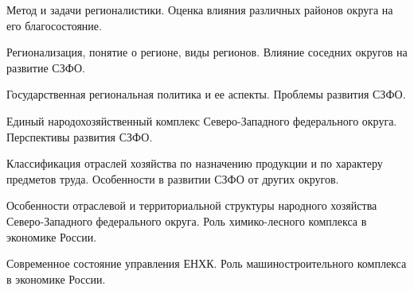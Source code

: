 \documentclass[
	14pt,
	a4paper,
	]
	{scrartcl}
\begin{document}
\shapk
{}
\setcounter{zad}{0}

\vfill
\z Метод и задачи регионалистики.
 \vfill
\z Оценка влияния различных районов округа на его благосостояние. \vfill

\vfill

\newpage


\shapk
{}
\setcounter{zad}{0}

\vfill
\z Регионализация, понятие о регионе, виды регионов.
 \vfill
\z Влияние соседних округов на развитие СЗФО.
 \vfill

\vfill

\newpage


\shapk
{}
\setcounter{zad}{0}

\vfill
\z Государственная региональная политика и ее аспекты.
 \vfill
\z Проблемы развития СЗФО.
 \vfill

\vfill

\newpage


\shapk
{}
\setcounter{zad}{0}

\vfill
\z Единый народохозяйственный комплекс Северо-Западного федерального округа.
 \vfill
\z Перспективы развития СЗФО.
 \vfill

\vfill

\newpage


\shapk
{}
\setcounter{zad}{0}

\vfill
\z Классификация отраслей хозяйства по назначению продукции и по характеру предметов труда.
 \vfill
\z Особенности в развитии СЗФО от других округов.
 \vfill

\vfill

\newpage


\shapk
{}
\setcounter{zad}{0}

\vfill
\z Особенности отраслевой и территориальной структуры народного хозяйства Северо-Западного федерального округа.
 \vfill
\z Роль химико-лесного комплекса в экономике России.
 \vfill

\vfill

\newpage


\shapk
{}
\setcounter{zad}{0}

\vfill
\z Современное состояние управления ЕНХК.
 \vfill
\z Роль машиностроительного комплекса в экономике России. 
 \vfill

\vfill

\newpage
\end{document}
